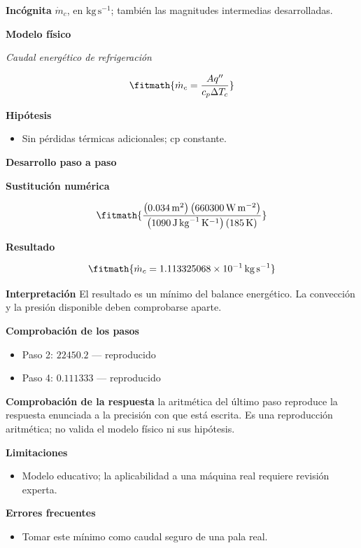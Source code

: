 \documentclass[10pt,openany]{book}
\begin{document}
\noindent\textbf{Incógnita}
$\dot{m}_c$, en $\mathrm{kg\,s^{-1}}$; también las magnitudes intermedias desarrolladas.

\noindent\textbf{Modelo físico}

\noindent\textit{Caudal energético de refrigeración}

\[
\fitmath{\dot{m}_c=\frac{A q''}{c_p \Delta T_c}}
\]

\noindent\textbf{Hipótesis}
\begin{itemize}
\item Sin pérdidas térmicas adicionales; cp constante.
\end{itemize}

\noindent\textbf{Desarrollo paso a paso}



\noindent\textbf{Sustitución numérica}

\[
\fitmath{\frac{\left(0.034\,\mathrm{m}^{2}\right) \left(660300\,\mathrm{W}\,\mathrm{m}^{-2}\right)}{\left(1090\,\mathrm{J}\,\mathrm{kg}^{-1}\,\mathrm{K}^{-1}\right) \left(185\,\mathrm{K}\right)}}
\]

\noindent\textbf{Resultado}

\[
\fitmath{\dot{m}_c=1.113325068\times10^{-1}\,\mathrm{kg}\,\mathrm{s}^{-1}}
\]

\noindent\textbf{Interpretación}
El resultado es un mínimo del balance energético. La convección y la presión disponible deben comprobarse aparte.

\noindent\textbf{Comprobación de los pasos}
\begin{itemize}
\item Paso 2: $22450.2$ — reproducido
\item Paso 4: $0.111333$ — reproducido
\end{itemize}

\noindent\textbf{Comprobación de la respuesta} la aritmética del último paso reproduce la respuesta enunciada a la precisión con que está escrita. Es una reproducción aritmética; no valida el modelo físico ni sus hipótesis.

\noindent\textbf{Limitaciones}
\begin{itemize}
\item Modelo educativo; la aplicabilidad a una máquina real requiere revisión experta.
\end{itemize}

\noindent\textbf{Errores frecuentes}
\begin{itemize}
\item Tomar este mínimo como caudal seguro de una pala real.
\end{itemize}
\end{document}
